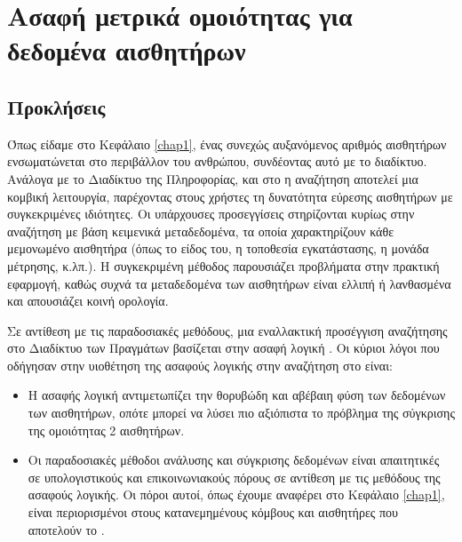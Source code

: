 \chapter{Ασαφή μετρικά ομοιότητας για δεδομένα αισθητήρων}
\label{chap4}
\section{Προκλήσεις}
Όπως είδαμε στο Κεφάλαιο \ref{chap1}, ένας συνεχώς αυξανόμενος αριθμός αισθητήρων ενσωματώνεται στο περιβάλλον του ανθρώπου, συνδέοντας αυτό με το διαδίκτυο.
Ανάλογα με το Διαδίκτυο της Πληροφορίας, και στο  η αναζήτηση αποτελεί μια κομβική λειτουργία, παρέχοντας στους χρήστες τη δυνατότητα εύρεσης αισθητήρων με συγκεκριμένες ιδιότητες.
Οι υπάρχουσες προσεγγίσεις \cite{Nath2007} στηρίζονται κυρίως στην αναζήτηση με βάση κειμενικά μεταδεδομένα, τα οποία χαρακτηρίζουν κάθε μεμονωμένο αισθητήρα (όπως το είδος του, η τοποθεσία εγκατάστασης, η μονάδα μέτρησης, κ.λπ.).
Η συγκεκριμένη μέθοδος παρουσιάζει προβλήματα στην πρακτική εφαρμογή, καθώς συχνά τα μεταδεδομένα των αισθητήρων είναι ελλιπή ή λανθασμένα και απουσιάζει κοινή ορολογία.
\par
Σε αντίθεση με τις παραδοσιακές μεθόδους, μια εναλλακτική προσέγγιση αναζήτησης στο Διαδίκτυο των Πραγμάτων βασίζεται στην ασαφή λογική \cite{Truong2012}. 
Οι κύριοι λόγοι που οδήγησαν στην υιοθέτηση της ασαφούς λογικής στην αναζήτηση στο  είναι:
\begin{itemize}
    \item Η ασαφής λογική αντιμετωπίζει την θορυβώδη και αβέβαιη φύση των δεδομένων των αισθητήρων, οπότε μπορεί να λύσει πιο αξιόπιστα το πρόβλημα της σύγκρισης της ομοιότητας 2 αισθητήρων.
    \item Οι παραδοσιακές μέθοδοι ανάλυσης και σύγκρισης δεδομένων είναι απαιτητικές σε υπολογιστικούς και επικοινωνιακούς πόρους σε αντίθεση με τις μεθόδους της ασαφούς λογικής. Οι πόροι αυτοί, όπως έχουμε αναφέρει στο Κεφάλαιο \ref{chap1}, είναι περιορισμένοι στους κατανεμημένους κόμβους και αισθητήρες που αποτελούν το .
\end{itemize}

